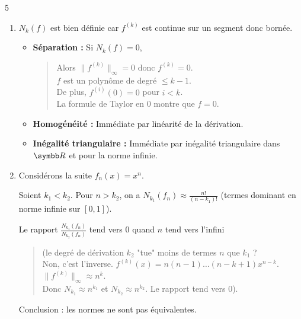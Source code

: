 \begin{correction}{5}
\begin{enumerate}
    \item  $N_k(f)$ est bien définie car $f^{(k)}$ est continue sur un segment donc bornée.
        \begin{itemize}
            \item \textbf{Séparation :} Si $N_k(f) = 0$, 
            \begin{quote}
                Alors $\|f^{(k)}\|_\infty = 0$ donc $f^{(k)} = 0$. \\
                $f$ est un polynôme de degré $\le k-1$. \\
                De plus, $f^{(i)}(0) = 0$ pour $i < k$. \\
                La formule de Taylor en 0 montre que $f=0$.
            \end{quote}
            \item \textbf{Homogénéité :} Immédiate par linéarité de la dérivation.
            \item \textbf{Inégalité triangulaire :} Immédiate par inégalité triangulaire dans $\R$ et pour la norme infinie.
        \end{itemize}

    \item Considérons la suite $f_n(x) = x^n$.
    
    Soient $k_1 < k_2$. Pour $n > k_2$, on a $N_{k_1}(f_n) \approx \frac{n!}{(n-k_1)!}$ (termes dominant en norme infinie sur $[0,1]$).

    Le rapport $\frac{N_{k_1}(f_n)}{N_{k_2}(f_n)}$ tend vers 0 quand $n$ tend vers l'infini 
    
    \begin{quote}
        (le degré de dérivation $k_2$ "tue" moins de termes $n$ que $k_1$ ? \\
        Non, c'est l'inverse. $f^{(k)}(x) = n(n-1)\dots(n-k+1)x^{n-k}$. $\|f^{(k)}\|_\infty \approx n^k$. \\
        Donc $N_{k_1} \approx n^{k_1}$ et $N_{k_2} \approx n^{k_2}$. Le rapport tend vers 0).
    \end{quote}

    Conclusion : les normes ne sont pas équivalentes.
\end{enumerate}
\end{correction}

